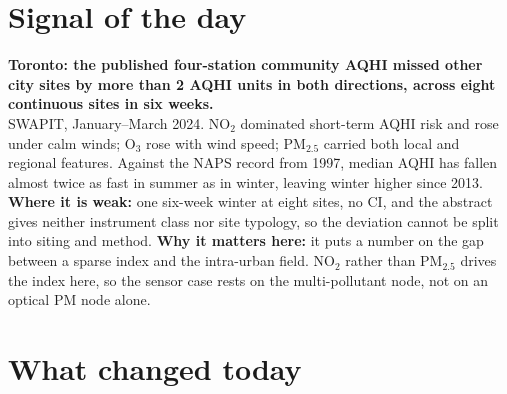 \documentclass[10pt]{article}
\begin{document}
\vspace{6mm}

\section*{\sffamily\bfseries\color{Deep}Signal of the day}
\vspace{-1.5mm}{\color{Amber}\rule{\linewidth}{1.1pt}}\vspace{2.5mm}

\begin{keybox}
{\sffamily\bfseries\small\color{Deep}Toronto: the published four-station community AQHI missed other city sites by more than 2 AQHI units in both directions, across eight continuous sites in six weeks.}\\[1.4mm]
\footnotesize
SWAPIT, January--March 2024. NO$_2$ dominated short-term AQHI risk and rose under calm winds; O$_3$ rose with wind speed; PM$_{2.5}$ carried both local and regional features. Against the NAPS record from 1997, median AQHI has fallen almost twice as fast in summer as in winter, leaving winter higher since 2013.
\textbf{Where it is weak:} one six-week winter at eight sites, no CI, and the abstract gives neither instrument class nor site typology, so the deviation cannot be split into siting and method.
\textbf{Why it matters here:} it puts a number on the gap between a sparse index and the intra-urban field. NO$_2$ rather than PM$_{2.5}$ drives the index here, so the sensor case rests on the multi-pollutant node, not on an optical PM node alone.\par
\end{keybox}

\vspace{3mm}

\section*{\sffamily\bfseries\color{Deep}What changed today}
\vspace{-1.5mm}{\color{Amber}\rule{\linewidth}{1.1pt}}\vspace{2.5mm}
\end{document}
